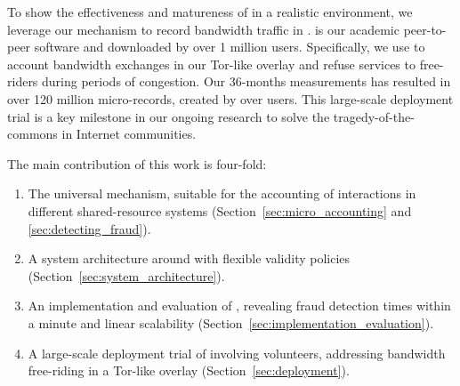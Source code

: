 To show the effectiveness and matureness of \ModelName{} in a realistic environment, we leverage our mechanism to record bandwidth traffic in \Tribler{}.
\Tribler{} is our academic peer-to-peer software and downloaded by over 1 million users.
Specifically, we use \ModelName{} to account bandwidth exchanges in our Tor-like overlay and refuse services to free-riders during periods of congestion.
Our 36-months measurements has resulted in over 120 million micro-records, created by over \TrialUsers{} users.
This large-scale deployment trial is a key milestone in our ongoing research to solve the tragedy-of-the-commons in Internet communities.

The main contribution of this work is four-fold:
\begin{enumerate}
	\item The universal \ModelName{} mechanism, suitable for the accounting of interactions in different shared-resource systems (Section~\ref{sec:micro_accounting} and \ref{sec:detecting_fraud}).
	\item A system architecture around \ModelName{} with flexible validity policies (Section~\ref{sec:system_architecture}).
	\item An implementation and evaluation of \ModelName{}, revealing fraud detection times within a minute and linear scalability (Section~\ref{sec:implementation_evaluation}).
	\item A large-scale deployment trial of \ModelName{} involving \TrialUsers{} volunteers, addressing bandwidth free-riding in a Tor-like overlay (Section~\ref{sec:deployment}).
\end{enumerate}



